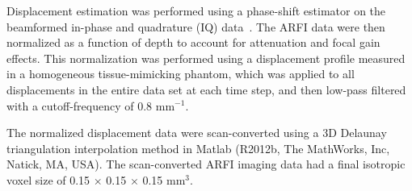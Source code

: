 

Displacement estimation was performed using a phase-shift estimator on the
beamformed in-phase and quadrature (IQ) data~\cite{Loupas95,pinton06}. The ARFI
data were then normalized as a function of depth to account for attenuation and
focal gain effects.  This normalization was performed using a displacement
profile measured in a homogeneous tissue-mimicking phantom, which was applied
to all displacements in the entire data set at each time step, and then
low-pass filtered with a cutoff-frequency of 0.8 mm$^{-1}$.

The normalized displacement data were scan-converted using a 3D Delaunay
triangulation interpolation method in Matlab (R2012b, The MathWorks, Inc,
Natick, MA, USA).  The scan-converted ARFI imaging data had a final isotropic
voxel size of 0.15 $\times$ 0.15 $\times$ 0.15 mm$^3$.
